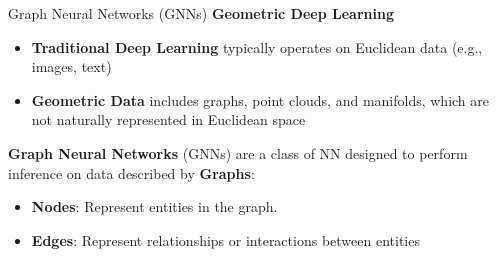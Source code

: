 \begin{frame}{Graph Neural Networks (GNNs)}
  \textbf{Geometric Deep Learning} 

  \begin{itemize}
      \item \textbf{Traditional Deep Learning} typically operates on Euclidean data (e.g., images, text)
      \item \textbf{Geometric Data} includes graphs, point clouds, and manifolds, which are not naturally represented in Euclidean space
  \end{itemize}

  \textbf{Graph Neural Networks} (GNNs) are a class of NN designed to perform inference on data described by \textbf{Graphs}: 
  \begin{itemize}
    \item \textbf{Nodes}: Represent entities in the graph.
    \item \textbf{Edges}: Represent relationships or interactions between entities
  \end{itemize}

\end{frame}


